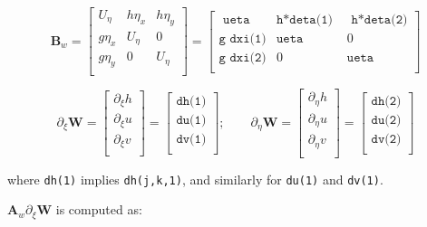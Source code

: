 \documentclass{article}
\newcommand{\code}[1]{\texttt{#1}}
\begin{document}
\[ \mathbf{B}_w = 
\begin{bmatrix}
    U_{\eta} & h \eta_x    & h \eta_{y} \\
    g \eta_x &    U_{\eta}  & 0    \\
    g \eta_y &      0       & U_{\eta}    \\    
\end{bmatrix} =
\begin{bmatrix}
    \code{ ueta }  & \code{h*deta(1) } & \code{ h*deta(2)}\\
    \code{g dxi(1)} & \code{ueta}  & 0  \\    
    \code{g dxi(2)} &     0  	   &  \code{ueta}  \\          
\end{bmatrix} 
\]


\[ \partial_\xi \mathbf{W} = 
\begin{bmatrix}
    \partial_\xi h \\
	\partial_\xi u \\
    \partial_\xi v \\
\end{bmatrix}
 =  {
	 \begin{bmatrix}
	 \code{dh(1)} \\
	 \code{du(1)} \\	 
	 \code{dv(1)} \\	 	 	 
\end{bmatrix} 
}  ;  \quad  \quad
\partial_\eta \mathbf{W} = 
\begin{bmatrix}
    \partial_\eta h \\
	\partial_\eta u \\
    \partial_\eta v \\
\end{bmatrix}
 =  {
	 \begin{bmatrix}
	 \code{dh(2)} \\
	 \code{du(2)} \\	 
	 \code{dv(2)} \\	 	 	 
\end{bmatrix} 
}
 \] 


where  \code{dh(1)} implies \code{dh(j,k,1)}, and similarly for  \code{du(1)} and  \code{dv(1)}. 

$ \mathbf{A}_w \partial_\xi \mathbf{W} $ is computed as:
\end{document}
